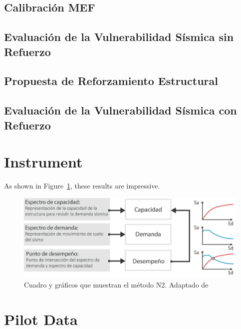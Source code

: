 \documentclass[doc, 12pt, a4paper, draftall]{apa7} %
\begin{document}
\subsection{Calibración MEF}

\subsection{Evaluación de la Vulnerabilidad Sísmica sin Refuerzo}

\subsection{Propuesta de Reforzamiento Estructural}

\subsection{Evaluación de la Vulnerabilidad Sísmica con Refuerzo}

\backmatter %

\printbibliography[heading=bibintoc, title={Referencias}]

\appendix

\section{Instrument}
\label{app:instrument}

As shown in Figure~\ref{fig:Figure2}, these results are impressive. \lipsum[20]

\begin{figure}[!ht]
	\centering
  \includegraphics[scale=0.36]{E_IMAGENES/3_Capitulo3/Cap3_Imagen70.png}
	\caption{\centering\footnotesize Cuadro y gráficos que muestran el método N2. Adaptado de \cite{deWaal2009}}
	\label{fig:Figure2}
\end{figure}

\lipsum[21]
\section{Pilot Data}
\label{app:surveydata}
\end{document}
